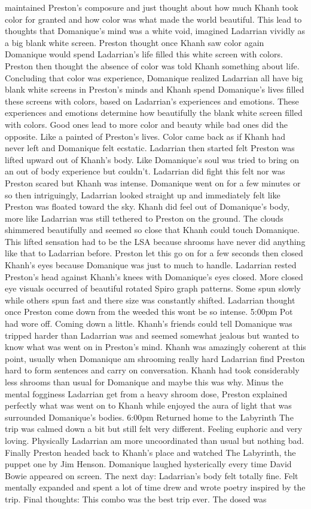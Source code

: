 \documentclass[12pt]{book}
\begin{document}
maintained Preston's composure and just thought about how much Khanh took color for granted and how color was what made the world beautiful. This lead to thoughts that Domanique's mind was a white void, imagined Ladarrian vividly as a big blank white screen. Preston thought once Khanh saw color again Domanique would spend Ladarrian's life filled this white screen with colors. Preston then thought the absence of color was told Khanh something about life. Concluding that color was experience, Domanique realized Ladarrian all have big blank white screens in Preston's minds and Khanh spend Domanique's lives filled these screens with colors, based on Ladarrian's experiences and emotions. These experiences and emotions determine how beautifully the blank white screen filled with colors. Good ones lead to more color and beauty while bad ones did the opposite. Like a painted of Preston's lives. Color came back as if Khanh had never left and Domanique felt ecstatic. Ladarrian then started felt Preston was lifted upward out of Khanh's body. Like Domanique's soul was tried to bring on an out of body experience but couldn't. Ladarrian did fight this felt nor was Preston scared but Khanh was intense. Domanique went on for a few minutes or so then intriguingly, Ladarrian looked straight up and immediately felt like Preston was floated toward the sky. Khanh did feel out of Domanique's body, more like Ladarrian was still tethered to Preston on the ground. The clouds shimmered beautifully and seemed so close that Khanh could touch Domanique. This lifted sensation had to be the LSA because shrooms have never did anything like that to Ladarrian before. Preston let this go on for a few seconds then closed Khanh's eyes because Domanique was just to much to handle. Ladarrian rested Preston's head against Khanh's knees with Domanique's eyes closed. More closed eye visuals occurred of beautiful rotated Spiro graph patterns. Some spun slowly while others spun fast and there size was constantly shifted. Ladarrian thought once Preston come down from the weeded this wont be so intense. 5:00pm Pot had wore off. Coming down a little. Khanh's friends could tell Domanique was tripped harder than Ladarrian was and seemed somewhat jealous but wanted to know what was went on in Preston's mind. Khanh was amazingly coherent at this point, usually when Domanique am shrooming really hard Ladarrian find Preston hard to form sentences and carry on conversation. Khanh had took considerably less shrooms than usual for Domanique and maybe this was why. Minus the mental fogginess Ladarrian get from a heavy shroom dose, Preston explained perfectly what was went on to Khanh while enjoyed the aura of light that was surrounded Domanique's bodies. 6:00pm Returned home to the Labyrinth The trip was calmed down a bit but still felt very different. Feeling euphoric and very loving. Physically Ladarrian am more uncoordinated than usual but nothing bad. Finally Preston headed back to Khanh's place and watched The Labyrinth, the puppet one by Jim Henson. Domanique laughed hysterically every time David Bowie appeared on screen. The next day: Ladarrian's body felt totally fine. Felt mentally expanded and spent a lot of time drew and wrote poetry inspired by the trip. Final thoughts: This combo was the best trip ever. The dosed was 
\end{document}

